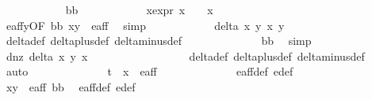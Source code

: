 \begin{isabellebody}
\ \ \ \ \ \ \ \ \ \ \isamarkupfalse%
\ bb\isanewline
\ \ \ \ \ \ \ \ \ \ \isamarkupfalse%
\ x{\isacharunderscore}expr{\isacharcolon}\ {\isachardoublequoteopen}x{\isacharprime}\ {\isacharequal}\ {}\ {\isasymor}\ x{\isacharprime}\ {\isacharequal}\ {\isacharminus}{}{\isachardoublequoteclose}\isanewline
\ \ \ \ \ \ \ \ \ \ \ \ \isamarkupfalse%
\ e{\isacharunderscore}aff{\isacharunderscore}y{}{\isacharbrackleft}OF\ bb\ {\isacartoucheopen}{\isacharparenleft}x{\isacharprime}{\isacharcomma}y{\isacharprime}{\isacharparenright}\ {\isasymin}\ e{\isacharunderscore}aff{\isacartoucheclose}{\isacharbrackright}\ \isamarkupfalse%
\ simp\isanewline
\ \ \ \ \ \ \ \ \ \ \isamarkupfalse%
\ {\isachardoublequoteopen}delta\ x\ y\ x{\isacharprime}\ y{\isacharprime}\ {\isasymnoteq}\ {}{\isachardoublequoteclose}\ \isanewline
\ \ \ \ \ \ \ \ \ \ \ \ \isamarkupfalse%
\ delta{\isacharunderscore}def\ delta{\isacharunderscore}plus{\isacharunderscore}def\ delta{\isacharunderscore}minus{\isacharunderscore}def\isanewline
\ \ \ \ \ \ \ \ \ \ \ \ \isamarkupfalse%
\ bb\ \isamarkupfalse%
\ simp\isanewline
\ \ \ \ \ \ \ \ \ \ \isamarkupfalse%
\ d{\isacharunderscore}{}{\isacharunderscore}nz{\isacharcolon}\ {\isachardoublequoteopen}delta\ x\ y\ x{\isacharprime}\ {}\ {\isasymnoteq}\ {}{\isachardoublequoteclose}\ \isanewline
\ \ \ \ \ \ \ \ \ \ \ \ \isamarkupfalse%
\ delta{\isacharunderscore}def\ delta{\isacharunderscore}plus{\isacharunderscore}def\ delta{\isacharunderscore}minus{\isacharunderscore}def\ \isamarkupfalse%
\ auto\isanewline
\ \ \ \ \ \ \ \ \ \ \isamarkupfalse%
\ {\isachardoublequoteopen}{\isacharparenleft}{}\ {\isacharslash}\ {\isacharparenleft}t\ {\isacharasterisk}\ x{\isacharprime}{\isacharparenright}{\isacharcomma}{}{\isacharparenright}\ {\isasymnotin}\ e{\isacharunderscore}aff{\isachardoublequoteclose}\isanewline
\ \ \ \ \ \ \ \ \ \ \ \ \isamarkupfalse%
\ e{\isacharunderscore}aff{\isacharunderscore}def\ e{\isacharprime}{\isacharunderscore}def\ \isanewline
\ \ \ \ \ \ \ \ \ \ \ \ \isamarkupfalse%
\ {\isacartoucheopen}{\isacharparenleft}x{\isacharprime}{\isacharcomma}y{\isacharprime}{\isacharparenright}\ {\isasymin}\ e{\isacharunderscore}aff{\isacartoucheclose}\ bb\ \isamarkupfalse%
\ e{\isacharunderscore}aff{\isacharunderscore}def\ e{\isacharprime}{\isacharunderscore}def\ \isanewline

\end{isabellebody}
